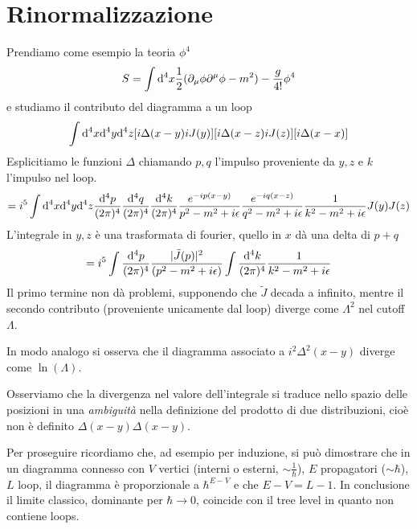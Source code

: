 \documentclass[a4paper, 11pt]{article}
\begin{document}
	\section{Rinormalizzazione}
	Prendiamo come esempio la teoria $\phi^4$ 
	\[ S = \int \mathrm{d}^4x \frac{1}{2}(\partial_\mu\phi\partial^\mu\phi-m^2)-\frac{g}{4!}\phi^4 \]
	e studiamo il contributo del diagramma a un loop
	\[ \int\mathrm{d}^4x \mathrm{d}^4y \mathrm{d}^4z [i\Delta(x-y) iJ(y)][i\Delta(x-z)iJ(z)][i\Delta(x-x)] \]
	Esplicitiamo le funzioni $\Delta$ chiamando $p,q$ l'impulso proveniente da $y,z$ e $k$ l'impulso nel loop.
	\[ = i^5 \int \mathrm{d}^4x\mathrm{d}^4y\mathrm{d}^4z \frac{\mathrm{d}^4p}{(2\pi)^4}\frac{\mathrm{d}^4q}{(2\pi)^4}\frac{\mathrm{d}^4k}{(2\pi)^4} \frac{e^{-ip(x-y)}}{p^2-m^2+i\epsilon}\frac{e^{-iq(x-z)}}{q^2-m^2+i\epsilon}\frac{1}{k^2-m^2+i\epsilon} J(y)J(z) \]
	L'integrale in $y,z$ è una trasformata di fourier, quello in $x$ dà una delta di $p+q$
	\[ = i^5 \int \frac{\mathrm{d}^4p}{(2\pi)^4} \frac{|\tilde{J}(p)|^2}{(p^2-m^2+i\epsilon)}\int\frac{\mathrm{d}^4k}{(2\pi)^4}\frac{1}{k^2-m^2+i\epsilon} \]
	Il primo termine non dà problemi, supponendo che $\tilde{J}$ decada a infinito, mentre il secondo contributo (proveniente unicamente dal loop) diverge come $\Lambda^2$ nel cutoff $\Lambda$.
	
	In modo analogo si osserva che il diagramma associato a $i^2\Delta^2(x-y)$ diverge come $\ln(\Lambda)$.%
	
	Osserviamo che la divergenza nel valore dell'integrale si traduce nello spazio delle posizioni in una \emph{ambiguità} nella definizione del prodotto di due distribuzioni, cioè non è definito $\Delta(x-y)\Delta(x-y)$.
	
	
	
	
		Per proseguire ricordiamo che, ad esempio per induzione, si può dimostrare che in un diagramma connesso con $V$ vertici (interni o esterni, $\sim\frac{1}{\hbar}$), $E$ propagatori ($\sim\hbar$), $L$ loop, il diagramma è proporzionale a $\hbar^{E-V}$ e che $E-V=L-1$. In conclusione il limite classico, dominante per $\hbar\rightarrow 0$, coincide con il tree level in quanto non contiene loops.
	
\end{document}
